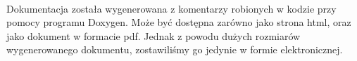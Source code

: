 \paragraph{}

Dokumentacja została wygenerowana z komentarzy robionych w kodzie przy pomocy programu Doxygen. Może być dostępna zarówno jako strona html, oraz jako dokument w formacie pdf. Jednak z powodu dużych rozmiarów wygenerowanego dokumentu, zostawiliśmy go jedynie w formie elektronicznej.

